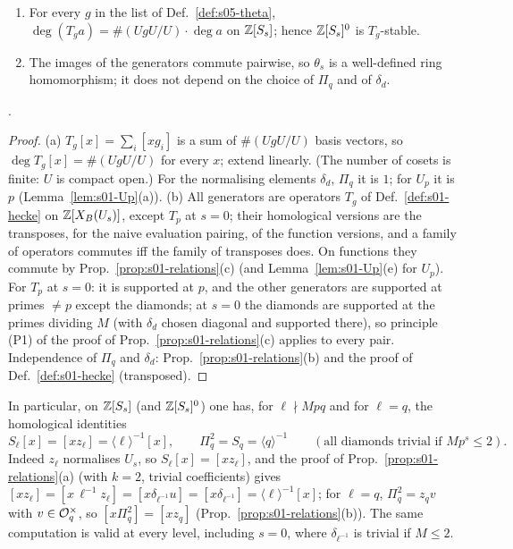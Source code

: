 \begin{lemma}\label{lem:s05-theta-welldef}
\begin{enumerate}[label=(\alph*)]
\item For every $g$ in the list of Def.~\ref{def:s05-theta}, $\deg(T_ga)=\#(UgU/U)\cdot\deg a$ on $\mathbb{Z}[S_s]$; hence $\mathbb{Z}[S_s]^0$ is
  $T_g$-stable.
\item The images of the generators commute pairwise, so $\theta_s$ is a well-defined ring homomorphism; it does not depend on the
  choice of $\Pi_q$ and of $\delta_d$.
\end{enumerate}
\stproved.
\end{lemma}
\begin{proof}
(a) $T_g[x]=\sum_{i}[xg_i]$ is a sum of $\#(UgU/U)$ basis vectors, so $\deg T_g[x]=\#(UgU/U)$ for every $x$; extend linearly.
(The number of cosets is finite: $U$ is compact open.) For the normalising elements $\delta_d$, $\Pi_q$ it is $1$; for $U_p$ it is $p$
(Lemma~\ref{lem:s01-Up}(a)).
(b) All generators are operators $T_g$ of Def.~\ref{def:s01-hecke} on $\mathbb{Z}[X_B(U_s)]$, except $T_p$ at $s=0$; their homological
versions are the transposes, for the naive evaluation pairing, of the function versions, and a family of operators commutes iff the
family of transposes does. On functions they commute by Prop.~\ref{prop:s01-relations}(c) (and Lemma~\ref{lem:s01-Up}(e) for $U_p$).
For $T_p$ at $s=0$: it is supported at $p$, and the other generators are supported at primes $\ne p$ except the diamonds; at $s=0$ the
diamonds are supported at the primes dividing $M$ (with $\delta_d$ chosen diagonal and supported there), so principle (P1) of the
proof of Prop.~\ref{prop:s01-relations}(c) applies to every pair. Independence of $\Pi_q$ and $\delta_d$:
Prop.~\ref{prop:s01-relations}(b) and the proof of Def.~\ref{def:s01-hecke} (transposed).
\end{proof}
\noindent In particular, on $\mathbb{Z}[S_s]$ (and $\mathbb{Z}[S_s]^0$) one has, for $\ell\nmid Mpq$ and for $\ell=q$, the homological identities
\begin{equation}\label{eq:s05-Sell}
S_\ell[x]=[xz_\ell]=\langle\ell\rangle^{-1}[x],\qquad \Pi_q^2=S_q=\langle q\rangle^{-1}\qquad(\text{all diamonds trivial if }Mp^s\le2).
\end{equation}
Indeed $z_\ell$ normalises $U_s$, so $S_\ell[x]=[xz_\ell]$, and the proof of Prop.~\ref{prop:s01-relations}(a) (with $k=2$, trivial
coefficients) gives $[xz_\ell]=[x\,\ell^{-1}z_\ell]=[x\delta_{\ell^{-1}}u]=[x\delta_{\ell^{-1}}]=\langle\ell\rangle^{-1}[x]$; for $\ell=q$, $\Pi_q^2=z_qv$ with
$v\in\mathcal{O}_q^\times$, so $[x\Pi_q^2]=[xz_q]$ (Prop.~\ref{prop:s01-relations}(b)). The same computation is valid at every level, including
$s=0$, where $\delta_{\ell^{-1}}$ is trivial if $M\le2$.


